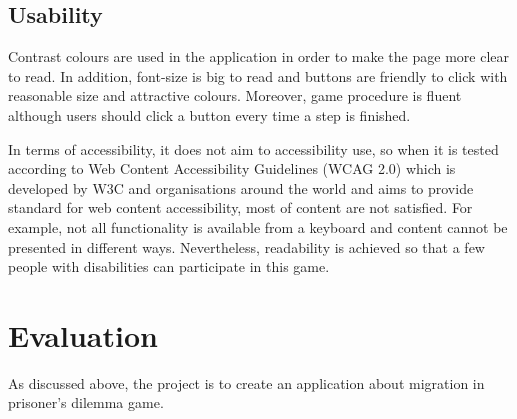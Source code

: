 \subsection{Usability}
Contrast colours are used in the application in order to make the page more clear to read. In addition, font-size is big to read and buttons are friendly to click with reasonable size and attractive colours. Moreover, game procedure is fluent although users should click a button every time a step is finished.

In terms of accessibility, it does not aim to accessibility use, so when it is tested according to Web Content Accessibility Guidelines (WCAG 2.0) which is developed by W3C and organisations around the world and aims to provide standard for web content accessibility, most of content are not satisfied. For example, not all functionality is available from a keyboard and content cannot be presented in different ways. Nevertheless, readability is achieved so that a few people with disabilities can participate in this game.
\section{Evaluation}
As discussed above, the project is to create an application about migration in prisoner's dilemma game. 

